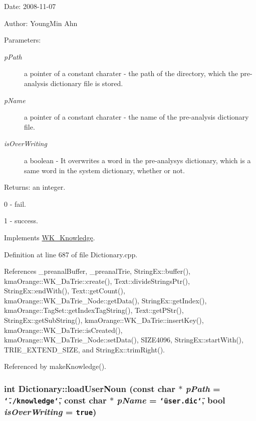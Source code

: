 \begin{Desc}
\item[Date:]2008-11-07 \end{Desc}
\begin{Desc}
\item[Author:]YoungMin Ahn \end{Desc}
\begin{Desc}
\item[Parameters:]
\begin{description}
\item[{\em pPath}]a pointer of a constant charater - the path of the directory, which the pre-analysis dictionary file is stored. \item[{\em pName}]a pointer of a constant charater - the name of the pre-analysis dictionary file. \item[{\em isOverWriting}]a boolean - It overwrites a word in the pre-analysys dictionary, which is a same word in the system dictionary, whether or not. \end{description}
\end{Desc}
\begin{Desc}
\item[Returns:]an integer.\par
 0 - fail.\par
 1 - success. \end{Desc}


Implements \hyperlink{classWK__Knowledge_9c8847731efad49fa0e4385325e2d4b7}{WK\_\-Knowledge}.

Definition at line 687 of file Dictionary.cpp.

References \_\-preanalBuffer, \_\-preanalTrie, StringEx::buffer(), kmaOrange::WK\_\-DaTrie::create(), Text::divideStringsPtr(), StringEx::endWith(), Text::getCount(), kmaOrange::WK\_\-DaTrie\_\-Node::getData(), StringEx::getIndex(), kmaOrange::TagSet::getIndexTagString(), Text::getPStr(), StringEx::getSubString(), kmaOrange::WK\_\-DaTrie::insertKey(), kmaOrange::WK\_\-DaTrie::isCreated(), kmaOrange::WK\_\-DaTrie\_\-Node::setData(), SIZE4096, StringEx::startWith(), TRIE\_\-EXTEND\_\-SIZE, and StringEx::trimRight().

Referenced by makeKnowledge().\hypertarget{classkmaOrange_1_1Dictionary_c0b9ddb423ad674ff15a77ee9663a641}{
\subsubsection[{loadUserNoun}]{\setlength{\rightskip}{0pt plus 5cm}int Dictionary::loadUserNoun (const char $\ast$ {\em pPath} = {\tt \char`\"{}./knowledge\char`\"{}}, \/  const char $\ast$ {\em pName} = {\tt \char`\"{}user.dic\char`\"{}}, \/  bool {\em isOverWriting} = {\tt true})}}
\label{classkmaOrange_1_1Dictionary_c0b9ddb423ad674ff15a77ee9663a641}


